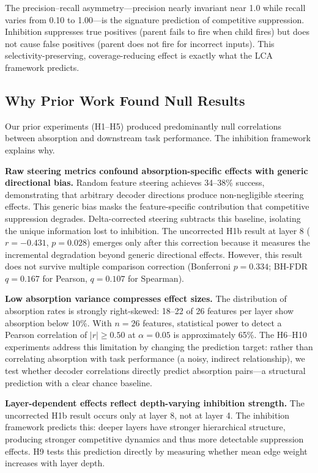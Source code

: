 \documentclass{article}
\begin{document}
The precision--recall asymmetry---precision nearly invariant near 1.0 while recall varies from 0.10 to 1.00---is the signature prediction of competitive suppression. Inhibition suppresses true positives (parent fails to fire when child fires) but does not cause false positives (parent does not fire for incorrect inputs). This selectivity-preserving, coverage-reducing effect is exactly what the LCA framework predicts.

\subsection{Why Prior Work Found Null Results}

Our prior experiments (H1--H5) produced predominantly null correlations between absorption and downstream task performance. The inhibition framework explains why.

\textbf{Raw steering metrics confound absorption-specific effects with generic directional bias.} Random feature steering achieves 34--38\% success, demonstrating that arbitrary decoder directions produce non-negligible steering effects. This generic bias masks the feature-specific contribution that competitive suppression degrades. Delta-corrected steering subtracts this baseline, isolating the unique information lost to inhibition. The uncorrected H1b result at layer 8 ($r = -0.431$, $p = 0.028$) emerges only after this correction because it measures the incremental degradation beyond generic directional effects. However, this result does not survive multiple comparison correction (Bonferroni $p = 0.334$; BH-FDR $q = 0.167$ for Pearson, $q = 0.107$ for Spearman).

\textbf{Low absorption variance compresses effect sizes.} The distribution of absorption rates is strongly right-skewed: 18--22 of 26 features per layer show absorption below 10\%. With $n = 26$ features, statistical power to detect a Pearson correlation of $|r| \geq 0.50$ at $\alpha = 0.05$ is approximately 65\%. The H6--H10 experiments address this limitation by changing the prediction target: rather than correlating absorption with task performance (a noisy, indirect relationship), we test whether decoder correlations directly predict absorption pairs---a structural prediction with a clear chance baseline.

\textbf{Layer-dependent effects reflect depth-varying inhibition strength.} The uncorrected H1b result occurs only at layer 8, not at layer 4. The inhibition framework predicts this: deeper layers have stronger hierarchical structure, producing stronger competitive dynamics and thus more detectable suppression effects. H9 tests this prediction directly by measuring whether mean edge weight increases with layer depth.
\end{document}

